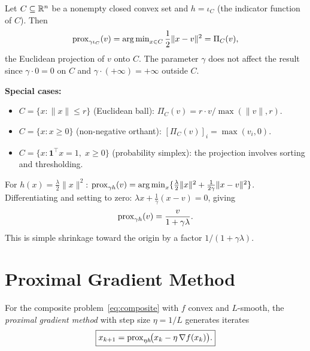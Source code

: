\documentclass[11pt,a4paper]{article}
\begin{document}
\begin{example}\label{ex:projection}
Let $C \subseteq \mathbb{R}^n$ be a nonempty closed convex set and
$h = \iota_C$ (the indicator function of $C$). Then
\[
  \operatorname{prox}_{\gamma \iota_C}(v)
  = \operatorname{arg\,min}_{x \in C} \frac{1}{2}\|x - v\|^2
  = \Pi_C(v),
\]
the Euclidean projection of $v$ onto $C$. The parameter $\gamma$ does
not affect the result since $\gamma \cdot 0 = 0$ on $C$ and
$\gamma \cdot (+\infty) = +\infty$ outside $C$.

\textbf{Special cases:}
\begin{itemize}
  \item $C = \{x : \|x\| \le r\}$ (Euclidean ball):
    $\Pi_C(v) = r \cdot v/\max(\|v\|, r)$.
  \item $C = \{x : x \ge 0\}$ (non-negative orthant):
    $[\Pi_C(v)]_i = \max(v_i, 0)$.
  \item $C = \{x : \mathbf{1}^\top x = 1,\; x \ge 0\}$
    (probability simplex): the projection involves sorting and
    thresholding.
\end{itemize}
\end{example}

\begin{example}\label{ex:l2-prox}
For $h(x) = \frac{\lambda}{2}\|x\|^2$:
$\operatorname{prox}_{\gamma h}(v) = \operatorname{arg\,min}_x \{\frac{\lambda}{2}\|x\|^2
+ \frac{1}{2\gamma}\|x - v\|^2\}$.
Differentiating and setting to zero: $\lambda x + \frac{1}{\gamma}(x - v) = 0$,
giving
\begin{equation}\label{eq:l2-prox}
  \operatorname{prox}_{\gamma h}(v) = \frac{v}{1 + \gamma\lambda}.
\end{equation}
This is simple shrinkage toward the origin by a factor $1/(1+\gamma\lambda)$.
\end{example}


\section{Proximal Gradient Method}\label{sec:prox-grad}

\begin{definition}\label{def:prox-grad}
For the composite problem~\eqref{eq:composite} with $f$ convex and
$L$-smooth, the \emph{proximal gradient method} with step size
$\eta = 1/L$ generates iterates
\begin{equation}\label{eq:prox-grad}
  \boxed{x_{k+1} = \operatorname{prox}_{\eta h}\!\bigl(x_k - \eta\,\nabla f(x_k)\bigr).}
\end{equation}
\end{definition}
\end{document}
